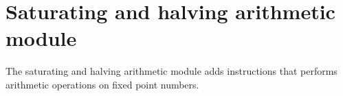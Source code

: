 %

\chapter{Saturating and halving arithmetic module}

The saturating and halving arithmetic module adds instructions that performs
arithmetic operations on fixed point numbers.

\tbd
